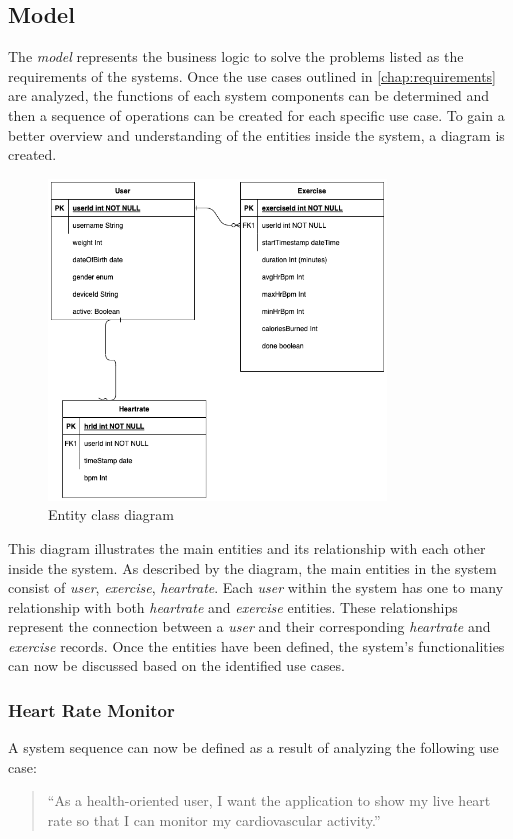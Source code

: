 \subsection{Model}
\label{chap:model_design}
The \emph{model} represents the business logic to solve the problems listed as the requirements of the systems. Once the use cases outlined in \autoref{chap:requirements} are analyzed, the functions of each system components can be determined and then a sequence of operations can be created for each specific use case.
To gain a better overview and understanding of the entities inside the system, a diagram is created.
\begin{figure}[H]
    \centering
    \includegraphics[width=0.8\textwidth]{diagrams/ham-entity.drawio.png}
    \caption{Entity class diagram}
    \label{fig:entity_diagram}
\end{figure}
This diagram illustrates the main entities and its relationship with each other inside the system. As described by the diagram, the main entities in the system consist of \emph{user}, \emph{exercise}, \emph{heartrate}. 
Each \emph{user} within the system has one to many relationship with both \emph{heartrate} and \emph{exercise} entities. These relationships represent the connection between a \emph{user} and their corresponding \emph{heartrate} and \emph{exercise} records. 
Once the entities have been defined, the system's functionalities can now be discussed based on the identified use cases.

\subsubsection{Heart Rate Monitor}
\label{chap:hr_monitor_design}
A system sequence can now be defined as a result of analyzing the following use case:
\begin{quotation}
    \enquote{As a health-oriented user, I want the application to show my live heart rate so that I can monitor my cardiovascular activity.} 
\end{quotation}

